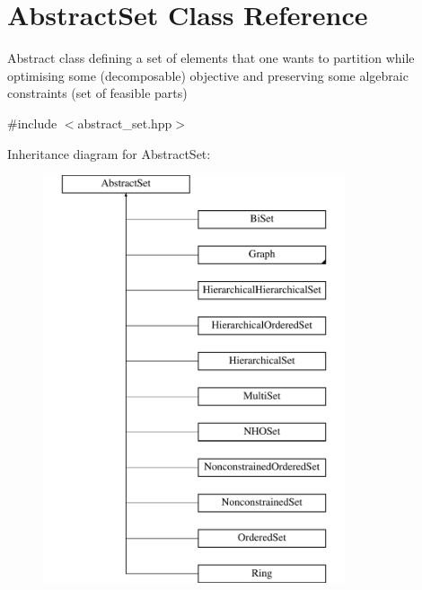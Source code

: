 \hypertarget{classAbstractSet}{\section{Abstract\-Set Class Reference}
\label{classAbstractSet}
}


Abstract class defining a set of elements that one wants to partition while optimising some (decomposable) objective and preserving some algebraic constraints (set of feasible parts)  




{\ttfamily \#include $<$abstract\-\_\-set.\-hpp$>$}

Inheritance diagram for Abstract\-Set\-:\begin{figure}[H]
\begin{center}
\leavevmode
\includegraphics[height=12.000000cm]{classAbstractSet}
\end{center}
\end{figure}
